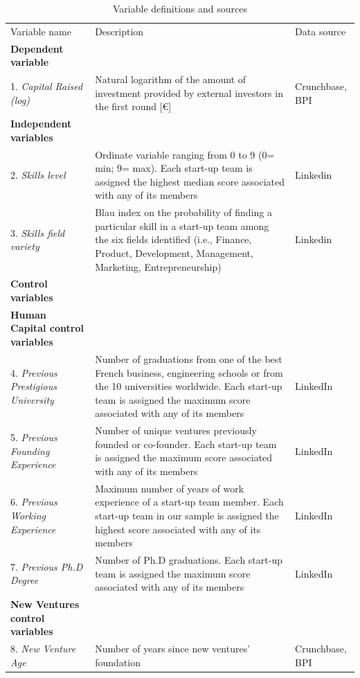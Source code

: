 \documentclass[12pt]{article}
\begin{document}
\clearpage
\begin{table} [ht]
\caption{Variable definitions and sources}
\scriptsize
\renewcommand{\arraystretch}{1.5}
\begin{tabularx}{\textwidth}{ p{5cm} p{7cm} p{2.2cm} }
\toprule
\multicolumn{1}{l}{Variable name}&\multicolumn{1}{l}{Description}&\multicolumn{1}{l}{Data source}\\
\cmidrule(r){1-3}
\textbf{Dependent variable}& &\\
1. \textit{Capital Raised (log)} & Natural logarithm of the amount of investment provided by external investors in the first round [€] & Crunchbase, BPI \\
\textbf{Independent variables}& &\\
2. \textit{Skills level} & Ordinate variable ranging from 0 to 9 (0= min; 9= max). Each start-up team is assigned the highest median score associated with any of its members & Linkedin\\
3. \textit{Skills field variety} & Blau index on the probability of finding a particular skill in a start-up team among the six fields identified (i.e., Finance, Product, Development, Management, Marketing, Entrepreneurship) & Linkedin \\
\textbf{Control variables}& &\\
\textbf{Human Capital control variables}& &\\
4. \textit{Previous Prestigious University} & Number of graduations from one of the best French business, engineering schools or from the 10 universities worldwide. Each start-up team is assigned the maximum score associated with any of its members & LinkedIn\\
5. \textit{Previous Founding Experience} & Number of unique ventures previously founded or co-founder. Each start-up team is assigned the maximum score associated with any of its members & LinkedIn\\
6. \textit{Previous Working Experience} & Maximum number of years of work experience of a start-up team member. Each  start-up team in our sample is assigned the highest score associated with any of its members & LinkedIn\\
7. \textit{Previous Ph.D Degree} & Number of Ph.D graduations. Each start-up team is assigned the maximum score associated with any of its members & LinkedIn\\
\textbf{New Ventures control variables}& &\\
8. \textit{New Venture Age} & Number of years since new ventures' foundation & Crunchbase, BPI\\

\end{tabularx}
\end{table}
\end{document}
